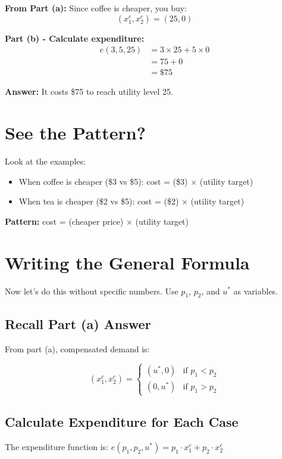 \documentclass[11pt]{article}
\begin{document}
\textbf{From Part (a):} Since coffee is cheaper, you buy:
$$(x_1^c, x_2^c) = (25, 0)$$

\textbf{Part (b) - Calculate expenditure:}
\begin{align*}
e(3, 5, 25) &= 3 \times 25 + 5 \times 0 \\
&= 75 + 0 \\
&= \$75
\end{align*}

\textbf{Answer:} It costs \$75 to reach utility level 25.

\section{See the Pattern?}

Look at the examples:
\begin{itemize}
\item When coffee is cheaper (\$3 vs \$5): cost = (\$3) $\times$ (utility target)
\item When tea is cheaper (\$2 vs \$5): cost = (\$2) $\times$ (utility target)
\end{itemize}

\textbf{Pattern:} cost = (cheaper price) $\times$ (utility target)

\section{Writing the General Formula}

Now let's do this without specific numbers. Use $p_1$, $p_2$, and $u^*$ as variables.

\subsection{Recall Part (a) Answer}

From part (a), compensated demand is:

$$(x_1^c, x_2^c) = \begin{cases}
(u^*, 0) & \text{if } p_1 < p_2 \\
(0, u^*) & \text{if } p_1 > p_2
\end{cases}$$

\subsection{Calculate Expenditure for Each Case}

The expenditure function is: $e(p_1, p_2, u^*) = p_1 \cdot x_1^c + p_2 \cdot x_2^c$
\end{document}
